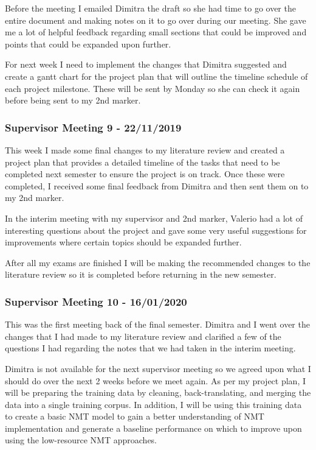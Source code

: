 Before the meeting I emailed Dimitra the draft so she had time to go over the entire document and making notes on it to go over during our meeting. She gave me a lot of helpful feedback regarding small sections that could be improved and points that could be expanded upon further.

For next week I need to implement the changes that Dimitra suggested and create a gantt chart for the project plan that will outline the timeline schedule of each project milestone. These will be sent by Monday so she can check it again before being sent to my 2nd marker.

\subsubsection{Supervisor Meeting 9 - 22/11/2019}
This week I made some final changes to my literature review and created a project plan that provides a detailed timeline of the tasks that need to be completed next semester to ensure the project is on track. Once these were completed, I received some final feedback from Dimitra and then sent them on to my 2nd marker.

In the interim meeting with my supervisor and 2nd marker, Valerio had a lot of interesting questions about the project and gave some very useful suggestions for improvements where certain topics should be expanded further.

After all my exams are finished I will be making the recommended changes to the literature review so it is completed before returning in the new semester.

\subsubsection{Supervisor Meeting 10 - 16/01/2020}
This was the first meeting back of the final semester. Dimitra and I went over the changes that I had made to my literature review and clarified a few of the questions I had regarding the notes that we had taken in the interim meeting.

Dimitra is not available for the next supervisor meeting so we agreed upon what I should do over the next 2 weeks before we meet again. As per my project plan, I will be preparing the training data by cleaning, back-translating, and merging the data into a single training corpus. In addition, I will be using this training data to create a basic \acrshort{NMT} model to gain a better understanding of \acrshort{NMT} implementation and generate a baseline performance on which to improve upon using the low-resource \acrshort{NMT} approaches.